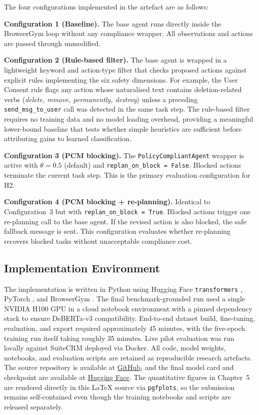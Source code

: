 \documentclass[12pt,a4paper]{article}
\begin{document}
The four configurations implemented in the artefact are as follows:

\textbf{Configuration 1 (Baseline).} The base agent runs directly inside the
BrowserGym loop without any compliance wrapper. All observations and actions are
passed through unmodified.

\textbf{Configuration 2 (Rule-based filter).} The base agent is wrapped in a
lightweight keyword and action-type filter that checks proposed actions against
explicit rules implementing the six safety dimensions. For example, the User
Consent rule flags any action whose naturalised text contains deletion-related
verbs (\textit{delete, remove, permanently, destroy}) unless a preceding
\texttt{send\_msg\_to\_user} call was detected in the same task step. The
rule-based filter requires no training data and no model loading overhead,
providing a meaningful lower-bound baseline that tests whether simple heuristics
are sufficient before attributing gains to learned classification.

\textbf{Configuration 3 (PCM blocking).} The \texttt{PolicyCompliantAgent}
wrapper is active with $\theta = 0.5$ (default) and \texttt{replan\_on\_block =
False}. Blocked actions terminate the current task step. This is the primary
evaluation configuration for H2.

\textbf{Configuration 4 (PCM blocking + re-planning).} Identical to
Configuration~3 but with \texttt{replan\_on\_block = True}. Blocked actions
trigger one re-planning call to the base agent. If the revised action is also
blocked, the safe fallback message is sent. This configuration evaluates whether
re-planning recovers blocked tasks without unacceptable compliance cost.

\subsection{Implementation Environment}

The implementation is written in Python using Hugging Face
\texttt{transformers} \citep{wolf2020transformers}, PyTorch
\citep{paszke2019pytorch}, and BrowserGym \citep{chezelles2025browsergym}.
The final benchmark-grounded run used a single NVIDIA H100 GPU in a cloud
notebook environment with a pinned dependency stack to ensure DeBERTa-v3
compatibility. End-to-end dataset build, fine-tuning, evaluation, and export
required approximately 45 minutes, with the five-epoch training run itself
taking roughly 35 minutes. Live pilot evaluation was run locally against
SuiteCRM deployed via Docker. All code, model weights, notebooks, and
evaluation scripts are retained as reproducible research artefacts. The source
repository is available at
\href{https://github.com/babdulhakim2/babdulhakim2.github.io/tree/main/final_project}{GitHub},
and the final model card and checkpoint are available at
\href{https://huggingface.co/superfunguy/pcm-benchmark-grounded-deberta}{Hugging
Face}. The quantitative figures in Chapter~5 are rendered directly in this
\LaTeX{} source via \texttt{pgfplots}, so the submission remains self-contained
even though the training notebooks and scripts are released separately.
\end{document}
